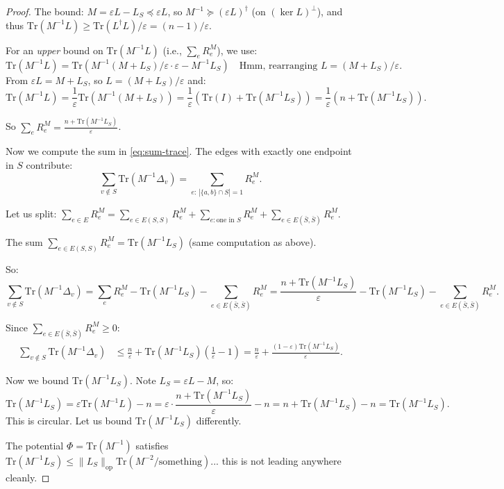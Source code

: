 \documentclass[12pt]{article}
\theoremstyle{definition}
\begin{document}
\begin{proof}
The bound: $M = \varepsilon L - L_S \preceq \varepsilon L$, so $M^{-1} \succeq (\varepsilon L)^\dagger$ (on $(\ker L)^\perp$), and thus $\mathrm{Tr}(M^{-1}L) \geq \mathrm{Tr}(L^\dagger L)/\varepsilon = (n-1)/\varepsilon$.

For an \emph{upper} bound on $\mathrm{Tr}(M^{-1}L)$ (i.e., $\sum_e R_e^M$), we use:
$$\mathrm{Tr}(M^{-1}L) = \mathrm{Tr}(M^{-1}(M + L_S)/\varepsilon\cdot\varepsilon - M^{-1}L_S) \quad\text{Hmm, rearranging }L = (M+L_S)/\varepsilon.$$
From $\varepsilon L = M + L_S$, so $L = (M+L_S)/\varepsilon$ and:
$$\mathrm{Tr}(M^{-1}L) = \frac{1}{\varepsilon}\mathrm{Tr}(M^{-1}(M+L_S)) = \frac{1}{\varepsilon}(\mathrm{Tr}(I) + \mathrm{Tr}(M^{-1}L_S)) = \frac{1}{\varepsilon}(n + \mathrm{Tr}(M^{-1}L_S)).$$

So $\sum_e R_e^M = \frac{n + \mathrm{Tr}(M^{-1}L_S)}{\varepsilon}$.

Now we compute the sum in \eqref{eq:sum-trace}. The edges with exactly one endpoint in $S$ contribute:
$$\sum_{v\notin S}\mathrm{Tr}(M^{-1}\Delta_v) = \sum_{e:\,|\{a,b\}\cap S|=1}R_e^M.$$

Let us split: $\sum_{e\in E}R_e^M = \sum_{e\in E(S,S)}R_e^M + \sum_{e:\text{one in }S}R_e^M + \sum_{e\in E(\bar S,\bar S)}R_e^M$.

The sum $\sum_{e\in E(S,S)}R_e^M = \mathrm{Tr}(M^{-1}L_S)$ (same computation as above).

So:
$$\sum_{v\notin S}\mathrm{Tr}(M^{-1}\Delta_v) = \sum_e R_e^M - \mathrm{Tr}(M^{-1}L_S) - \sum_{e\in E(\bar S,\bar S)}R_e^M = \frac{n+\mathrm{Tr}(M^{-1}L_S)}{\varepsilon} - \mathrm{Tr}(M^{-1}L_S) - \sum_{e\in E(\bar S,\bar S)}R_e^M.$$

Since $\sum_{e\in E(\bar S,\bar S)}R_e^M \geq 0$:
\begin{align*}
\sum_{v\notin S}\mathrm{Tr}(M^{-1}\Delta_v) &\leq \frac{n}{\varepsilon} + \mathrm{Tr}(M^{-1}L_S)\left(\frac{1}{\varepsilon}-1\right) = \frac{n}{\varepsilon} + \frac{(1-\varepsilon)\mathrm{Tr}(M^{-1}L_S)}{\varepsilon}.
\end{align*}

Now we bound $\mathrm{Tr}(M^{-1}L_S)$. Note $L_S = \varepsilon L - M$, so:
$$\mathrm{Tr}(M^{-1}L_S) = \varepsilon\mathrm{Tr}(M^{-1}L) - n = \varepsilon\cdot\frac{n+\mathrm{Tr}(M^{-1}L_S)}{\varepsilon} - n = n+\mathrm{Tr}(M^{-1}L_S)-n = \mathrm{Tr}(M^{-1}L_S).$$
This is circular. Let us bound $\mathrm{Tr}(M^{-1}L_S)$ differently.

The potential $\Phi = \mathrm{Tr}(M^{-1})$ satisfies $\mathrm{Tr}(M^{-1}L_S) \leq \|L_S\|_{\mathrm{op}}\mathrm{Tr}(M^{-2}/\mathrm{something})$... this is not leading anywhere cleanly.


\end{proof}
\end{document}
